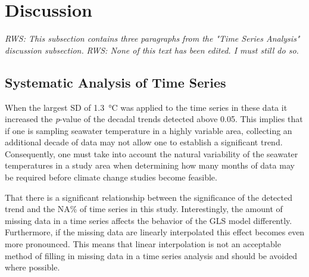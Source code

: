 \documentclass{ametsoc}
\begin{document}
\section{Discussion}

\emph{RWS: This subsection contains three paragraphs from the "Time Series Analysis" discussion subsection.}
\emph{RWS: None of this text has been edited. I must still do so.}
\subsection{Systematic Analysis of Time Series}


When the largest SD of \SI{1.3}{\degreeCelsius} was applied to the time series in these data it increased the \emph{p}-value of the decadal trends detected above 0.05. This implies that if one is sampling seawater temperature in a highly variable area, collecting an additional decade of data may not allow one to establish a significant trend. Consequently, one must take into account the natural variability of the seawater temperatures in a study area when determining how many months of data may be required before climate change studies become feasible.

That there is a significant relationship between the significance of the detected trend and the NA\% of time series in this study. Interestingly, the amount of missing data in a time series affects the behavior of the GLS model differently. Furthermore, if the missing data are linearly interpolated this effect becomes even more pronounced. This means that linear interpolation is not an acceptable method of filling in missing data in a time series analysis and should be avoided where possible.
\end{document}
